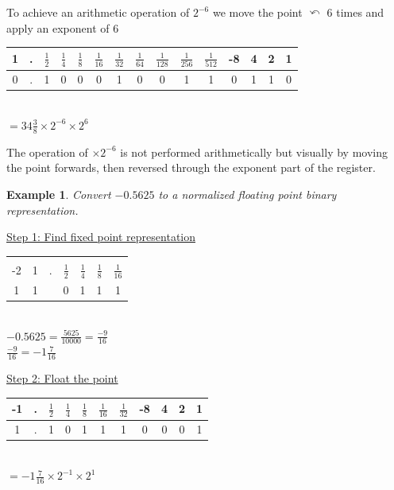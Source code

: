\documentclass[12pt, a4paper]{report}
\newtheorem{example}{Example}
\begin{document}
	
	To achieve an arithmetic operation of $2^{-6}$ we move the point $\curvearrowleft$ 6 times and apply an exponent of $6$\\
	\begin{center}
		\begin{tabular}{ccccccccccc|cccc}
			1 & . & $\frac{1}{2}$ & $\frac{1}{4}$ & $\frac{1}{8}$ & $\frac{1}{16}$ & $\frac{1}{32}$ & $\frac{1}{64}$ & $\frac{1}{128}$ & $\frac{1}{256}$ & $\frac{1}{512}$ & -8 & 4 & 2 & 1 \\ \hline
			0 & . & 1             & 0             & 0             & 0              & 1              & 0              & 0               & 1               & 1               & 0  & 1 & 1 & 0 
		\end{tabular}\\
		$=34\frac{3}{8} \times 2^{-6} \times 2^{6}$
	\end{center}
	\quad The operation of $\times 2^{-6}$ is not performed arithmetically but visually by moving the point forwards, then reversed through the exponent part of the register.
	\begin{example}
		Convert $-0.5625$ to a normalized floating point binary representation.
	\end{example}
	\underline{Step 1: Find fixed point representation}
	\begin{center}
		\begin{tabular}{ccccccc}
			&   &   &               &               &               &                \\
			-2 & 1 & . & $\frac{1}{2}$ & $\frac{1}{4}$ & $\frac{1}{8}$ & $\frac{1}{16}$ \\ \hline
			1  & 1 &   & 0             & 1             & 1             & 1              
		\end{tabular}\\
		$-0.5625 = \frac{5625}{10000}= \frac{-9}{16}$\\
		$\frac{-9}{16} = -1\frac{7}{16}$
	\end{center}
	\underline{Step 2: Float the point}
	\begin{center}
		\begin{tabular}{ccccccc|cccc}
			-1 & . & $\frac{1}{2}$ & $\frac{1}{4}$ & $\frac{1}{8}$ & $\frac{1}{16}$ & $\frac{1}{32}$ & -8 & 4 & 2 & 1 \\ \hline
			1  & . & 1             & 0             & 1             & 1              & 1              & 0  & 0 & 0 & 1 
		\end{tabular}\\
		$= -1\frac{7}{16} \times 2^{-1} \times 2^1$
	\end{center}
\end{document}
